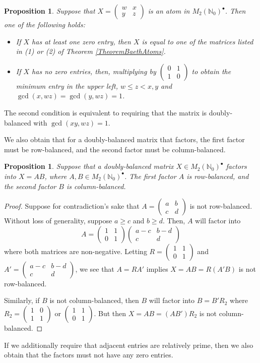 \documentclass{amsart}
\newcommand{\pmx}[4]{\begin{pmatrix} #1 & #2 \\ #3 & #4 \end{pmatrix}}
\newcommand{\mtwo}{M_2(\mathbb{N}_0)^\bullet}
\newtheorem{prop}[theorem]{Proposition}
\begin{document}
\begin{prop}\cite[Prop. 4.5]{Baeth21} \label{PropBaethAtoms}
Suppose that $X = \pmx{w}{x}{y}{z}$ is an atom in $\mtwo$. Then one of the following holds:
\begin{itemize}
    \item If $X$ has at least one zero entry, then $X$ is equal to one of the matrices listed in (1) or (2) of Theorem \ref{TheoremBaethAtoms}.
    \item If $X$ has no zero entries, then, multiplying by $\pmx{0}{1}{1}{0}$ to obtain the minimum entry in the upper left, $w \leq z< x,y $ and $\gcd(x, wz)=\gcd(y,wz)=1$.
\end{itemize}
\end{prop}
The second condition is equivalent to requiring that the matrix is doubly-balanced with $\gcd(xy, wz)=1$. 


We also obtain that for a doubly-balanced matrix that factors, the first factor must be row-balanced, and the second factor must be column-balanced.

\begin{prop}\label{lem:balanced} Suppose that a doubly-balanced matrix $X\in \mtwo$ factors into $X=AB$, where $A, B \in \mtwo$. The first factor $A$ is row-balanced, and the second factor $B$ is column-balanced.
\end{prop}

\begin{proof}
   Suppose for contradiction's sake that $A=\pmx{a}{b}{c}{d}$ is not row-balanced. Without loss of generality, suppose $a\geq c$ and $b\geq d$. Then, $A$ will factor into
    \[A= \pmx{1}{1}{0}{1}\pmx{a-c}{b-d}{c}{d}\]
    where both matrices are non-negative. Letting $R=\pmx{1}{1}{0}{1}$ and $A'=\pmx{a-c}{b-d}{c}{d}$, we see that  $A=RA'$ implies  $X=AB = R(A' B)$ is not row-balanced.

    Similarly, if $B$ is not column-balanced, then $B$ will factor into $B=B' R_2$ where $R_2=\pmx1011$ or $\pmx1101$. But then $X=AB=(AB')R_2$ is not column-balanced.
\end{proof}

If we additionally require that adjacent entries are relatively prime, then we also obtain that the factors must not have any zero entries.
\end{document}
